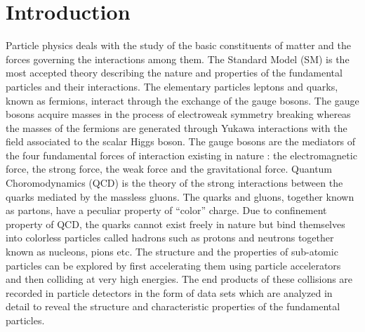 \chapter{Introduction}
\label{chap:Introduction}

Particle physics deals with the study of the basic constituents of matter and the forces governing the interactions among them. The Standard Model (SM) is the most accepted theory describing the nature and properties of the fundamental particles and their interactions. The elementary particles leptons and quarks, known as fermions, interact through the exchange of the gauge bosons. The gauge bosons acquire masses in the process of electroweak symmetry breaking whereas the masses of the fermions are generated through Yukawa interactions with the field associated to the scalar Higgs boson. The gauge bosons are the mediators of the four fundamental forces of interaction existing in nature : the electromagnetic force, the strong force, the weak force and the gravitational force. Quantum Choromodynamics (QCD) is the theory of the strong interactions between the quarks mediated by the massless gluons. The quarks and gluons, together known as partons, have a peculiar property of ``color'' charge. Due to confinement property of QCD, the quarks cannot exist freely in nature but bind themselves into colorless particles called hadrons such as protons and neutrons together known as nucleons, pions etc. The structure and the properties of sub-atomic particles can be explored by first accelerating them using particle accelerators and then colliding at very high energies. The end products of these collisions are recorded in particle detectors in the form of data sets which are analyzed in detail to reveal the structure and characteristic properties of the fundamental particles.

